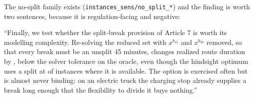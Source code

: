 \begin{anew}
The no-split family exists (\texttt{instances\_sens/no\_split\_*}) and the
finding is worth two sentences, because it is regulation-facing and negative:

\medskip
``Finally, we test whether the split-break provision of Article 7 is worth its
modelling complexity. Re-solving the reduced set with $x^{b_{15}}$ and
$x^{b_{30}}$ removed, so that every break must be an unsplit 45 minutes, changes
realized route duration by , below the solver tolerance
on the oracle, even though the hindsight optimum uses a split at  of
instances where it is available. The option is exercised often but is almost
never binding: on an electric truck the charging stop already supplies a break
long enough that the flexibility to divide it buys nothing.''

\medskip
{}
\end{anew}



